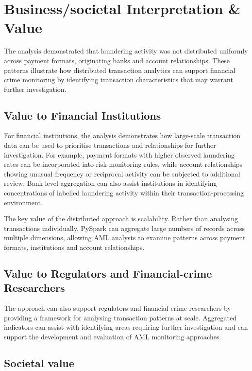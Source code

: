 \section{Business/societal Interpretation \& Value}

The analysis demonstrated that laundering activity was not distributed uniformly across
payment formats, originating banks and account relationships. These patterns illustrate
how distributed transaction analytics can support financial crime monitoring by
identifying transaction characteristics that may warrant further investigation.

\subsection{Value to Financial Institutions}

For financial institutions, the analysis demonstrates how large-scale transaction data
can be used to prioritise transactions and relationships for further investigation. For
example, payment formats with higher observed laundering rates can be incorporated
into risk-monitoring rules, while account relationships showing unusual frequency or
reciprocal activity can be subjected to additional review. Bank-level aggregation can
also assist institutions in identifying concentrations of labelled laundering activity within
their transaction-processing environment.

The key value of the distributed approach is scalability. Rather than analysing
transactions individually, PySpark can aggregate large numbers of records across
multiple dimensions, allowing AML analysts to examine patterns across payment
formats, institutions and account relationships.

\subsection{Value to Regulators and Financial-crime Researchers}

The approach can also support regulators and financial-crime researchers by providing
a framework for analysing transaction patterns at scale. Aggregated indicators can
assist with identifying areas requiring further investigation and can support the
development and evaluation of AML monitoring approaches.

\subsection{Societal value}

